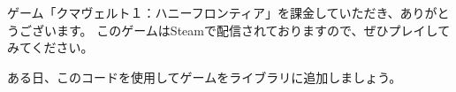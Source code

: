 
\renewcommand{\footercontentright}[0]{\thepage}
\enableCjkIndenting


\setupdecorations
{}



ゲーム「クマヴェルト１：ハニーフロンティア」を課金していただき、ありがとうございます。
このゲームはSteamで配信されておりますので、ぜひプレイしてみてください。

ある日、このコードを使用してゲームをライブラリに追加しましょう。


\noindent\begin{center}
    \noindent{}
\end{center}






